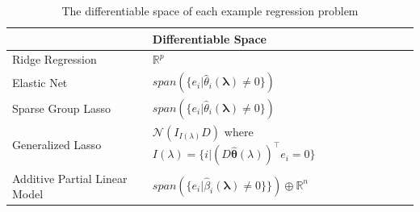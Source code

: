\documentclass[10pt,letterpaper]{article}
\begin{document}
\begin{table} 
\begin{center}

\begin{tabular}{| l | l | l | }
\hline
 &  Differentiable Space \\
\hline
Ridge Regression & $\mathbb{R}^p$\\
\hline
Elastic Net & $span(\{e_i | \hat{\theta}_i\left(\boldsymbol{\lambda}\right) \ne 0 \})$\\
\hline
Sparse Group Lasso & $span(\{e_i | \hat{\theta}_i\left(\boldsymbol{\lambda}\right) \ne 0 \})$ \\
\hline
Generalized Lasso & $\mathcal{N}(I_{I(\lambda)} D)$ where $I(\lambda) = \{ i | (D \hat{\boldsymbol{\theta}}(\lambda))^\top e_i = 0 \}$ \\
\hline
Additive Partial Linear Model & $span(\{e_i | \hat{\beta}_i\left(\boldsymbol{\lambda}\right) \ne 0 \} \})  \oplus  \mathbb{R}^{n}$\\
\hline
\end{tabular}
\end{center}
\caption {The differentiable space of each example regression problem}
\label{table:differentiableSpace}
\end{table}
\end{document}
